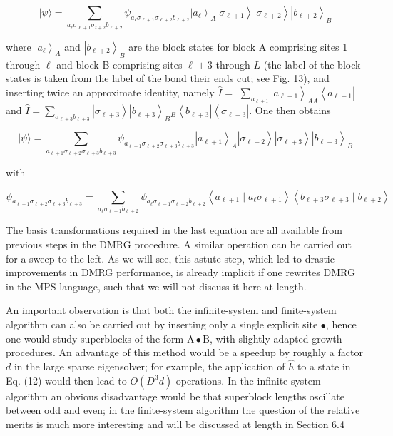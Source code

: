 \documentclass[12pt]{article}
\begin{document}
\begin{equation*}
|\psi\rangle=\sum_{a_{\ell} \sigma_{\ell+1} \sigma_{t+2} b_{\ell+2}} \psi_{a_{\ell} \sigma_{\ell+1} \sigma_{\ell+2} b_{\ell+2}}\left|a_{\ell}\right\rangle_{A}\left|\sigma_{\ell+1}\right\rangle\left|\sigma_{\ell+2}\right\rangle\left|b_{\ell+2}\right\rangle_{B} \tag{13}
\end{equation*}


where $\left|a_{\ell}\right\rangle_{A}$ and $\left|b_{\ell+2}\right\rangle_{B}$ are the block states for block A comprising sites 1 through $\ell$ and block B comprising sites $\ell+3$ through $L$ (the label of the block states is taken from the label of the bond their ends cut; see Fig. 13), and inserting twice an approximate identity, namely $\hat{I}=$ $\sum_{a_{\ell+1}}\left|a_{\ell+1}\right\rangle_{A A}\left\langle a_{\ell+1}\right|$ and $\hat{I}=\sum_{\sigma_{\ell+3} b_{\ell+3}}\left|\sigma_{\ell+3}\right\rangle\left|b_{\ell+3}\right\rangle_{B}{ }_{B}\left\langle b_{\ell+3}\right|\left\langle\sigma_{\ell+3}\right|$. One then obtains


\begin{equation*}
|\psi\rangle=\sum_{a_{\ell+1} \sigma_{\ell+2} \sigma_{\ell+3} b_{\ell+3}} \psi_{a_{\ell+1} \sigma_{\ell+2} \sigma_{\ell+3} b_{\ell+3}}\left|a_{\ell+1}\right\rangle_{A}\left|\sigma_{\ell+2}\right\rangle\left|\sigma_{\ell+3}\right\rangle\left|b_{\ell+3}\right\rangle_{B} \tag{14}
\end{equation*}


with


\begin{equation*}
\psi_{a_{\ell+1} \sigma_{\ell+2} \sigma_{\ell+3} b_{\ell+3}}=\sum_{a_{\ell} \sigma_{\ell+1} b_{\ell+2}} \psi_{a_{\ell} \sigma_{\ell+1} \sigma_{\ell+2} b_{\ell+2}}\left\langle a_{\ell+1} \mid a_{\ell} \sigma_{\ell+1}\right\rangle\left\langle b_{\ell+3} \sigma_{\ell+3} \mid b_{\ell+2}\right\rangle \tag{15}
\end{equation*}


The basis transformations required in the last equation are all available from previous steps in the DMRG procedure. A similar operation can be carried out for a sweep to the left. As we will see, this astute step, which led to drastic improvements in DMRG performance, is already implicit if one rewrites DMRG in the MPS language, such that we will not discuss it here at length.

An important observation is that both the infinite-system and finite-system algorithm can also be carried out by inserting only a single explicit site $\bullet$, hence one would study superblocks of the form $\mathrm{A} \bullet \mathrm{B}$, with slightly adapted growth procedures. An advantage of this method would be a speedup by roughly a factor $d$ in the large sparse eigensolver; for example, the application of $\hat{h}$ to a state in Eq. (12) would then lead to $O\left(D^{3} d\right)$ operations. In the infinite-system algorithm an obvious disadvantage would be that superblock lengths oscillate between odd and even; in the finite-system algorithm the question of the relative merits is much more interesting and will be discussed at length in Section 6.4
\end{document}
